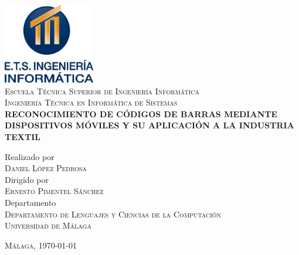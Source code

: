 \begin{titlepage}
\begin{center}

	\includegraphics[width=0.3\textwidth]{./img/logoescuela.jpg}~\\[0.5cm]

	\textsc{\large{Escuela Técnica Superior de Ingeniería Informática}} \\ [0.5cm]
	\textsc{\large{Ingeniería Técnica en Informática de Sistemas}} \\ [0.5cm]
	
	{ \LARGE \bfseries \uppercase{Reconocimiento de códigos de barras mediante dispositivos móviles y su aplicación a la industria textil} \\[1cm] }

	Realizado por \\
	\textsc{Daniel López Pedrosa} \\ [0.5cm]
	Dirigido por \\
	\textsc{Ernesto Pimentel Sánchez} \\ [0.5cm]
	Departamento \\
	\textsc{Departamento de Lenguajes y Ciencias de la Computación} \\ [0.5cm]
	\textsc{\Large{Universidad de Málaga}} \\

\vfill
\end{center}

\begin{flushright}
\textsc{Málaga, \today}
\end{flushright}
\end{titlepage}